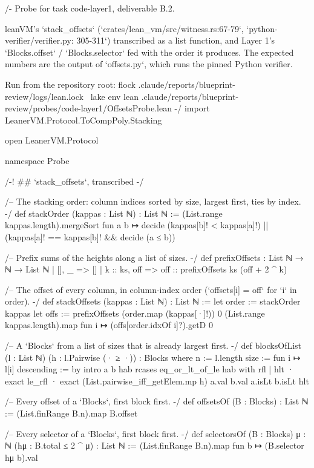 \begin{leancode}
/-
  Probe for task code-layer1, deliverable B.2.

  leanVM's `stack_offsets` (`crates/lean_vm/src/witness.rs:67-79`, `python-verifier/verifier.py:
  305-311`) transcribed as a list function, and Layer 1's `Blocks.offset` / `Blocks.selector`
  fed with the order it produces. The expected numbers are the output of `offsets.py`, which
  runs the pinned Python verifier.

  Run from the repository root:
    flock .claude/reports/blueprint-review/logs/lean.lock \
      lake env lean .claude/reports/blueprint-review/probes/code-layer1/OffsetsProbe.lean
-/
import LeanerVM.Protocol.ToCompPoly.Stacking

open LeanerVM.Protocol

namespace Probe

/-! ## `stack_offsets`, transcribed -/

/-- The stacking order: column indices sorted by size, largest first, ties by index. -/
def stackOrder (kappas : List ℕ) : List ℕ :=
  (List.range kappas.length).mergeSort fun a b ↦
    decide (kappas[b]! < kappas[a]!) || (kappas[a]! == kappas[b]! && decide (a ≤ b))

/-- Prefix sums of the heights along a list of sizes. -/
def prefixOffsets : List ℕ → ℕ → List ℕ
  | [], _ => []
  | k :: ks, off => off :: prefixOffsets ks (off + 2 ^ k)

/-- The offset of every column, in column-index order (`offsets[i] = off` for `i` in order). -/
def stackOffsets (kappas : List ℕ) : List ℕ :=
  let order := stackOrder kappas
  let offs := prefixOffsets (order.map (kappas[·]!)) 0
  (List.range kappas.length).map fun i ↦ (offs[order.idxOf i]?).getD 0

/-- A `Blocks` from a list of sizes that is already largest first. -/
def blocksOfList (l : List ℕ) (h : l.Pairwise (· ≥ ·)) : Blocks where
  n := l.length
  size := fun i ↦ l[i]
  descending := by
    intro a b hab
    rcases eq_or_lt_of_le hab with rfl | hlt
    · exact le_rfl
    · exact (List.pairwise_iff_getElem.mp h) a.val b.val a.isLt b.isLt hlt

/-- Every offset of a `Blocks`, first block first. -/
def offsetsOf (B : Blocks) : List ℕ := (List.finRange B.n).map B.offset

/-- Every selector of a `Blocks`, first block first. -/
def selectorsOf (B : Blocks) {μ : ℕ} (hμ : B.total ≤ 2 ^ μ) : List ℕ :=
  (List.finRange B.n).map fun b ↦ (B.selector hμ b).val


\end{leancode}
